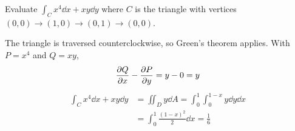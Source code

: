 \begin{example}
  Evaluate $\displaystyle\int_C x^4\dd{x} + xy\dd{y}$ where $C$ is the triangle
  with vertices $(0,0)\to(1,0)\to(0,1)\to(0,0)$.

  \begin{center}
  \end{center}

  The triangle is traversed counterclockwise, so Green's theorem applies. With
  $P = x^4$ and $Q = xy$,
  \[
    \frac{\partial Q}{\partial x} - \frac{\partial P}{\partial y} = y - 0 = y
  \]
  \begin{align*}
    \int_C x^4\dd{x} + xy\dd{y}
     & = \iint_D y\dd{A}
    = \int_0^1\!\int_0^{1-x} y\dd{y}\dd{x} \\
     & = \int_0^1 \frac{(1-x)^2}{2}\dd{x}
    = \frac{1}{6}
  \end{align*}
\end{example}


